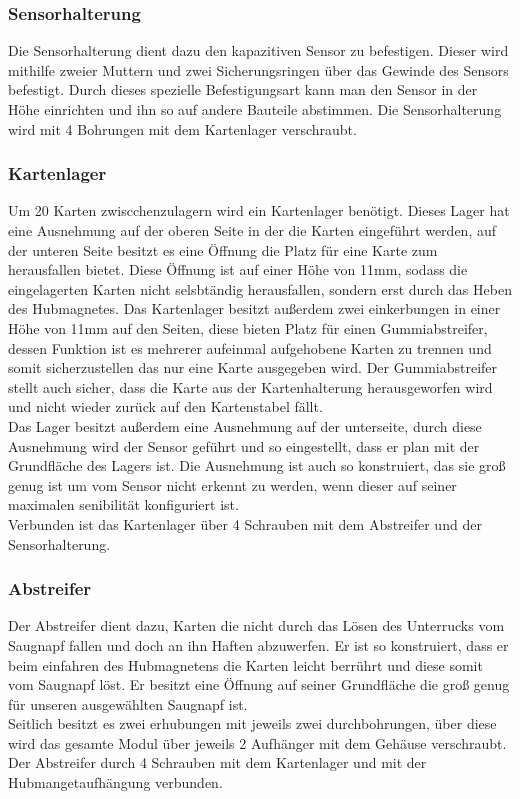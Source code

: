 \subsubsection{Sensorhalterung}
Die Sensorhalterung dient dazu den kapazitiven Sensor zu befestigen. Dieser wird mithilfe zweier Muttern und zwei Sicherungsringen
über das Gewinde des Sensors befestigt. Durch dieses spezielle Befestigungsart kann man den Sensor in der Höhe einrichten und ihn so
auf andere Bauteile abstimmen. Die Sensorhalterung wird mit 4 Bohrungen mit dem Kartenlager verschraubt.

\subsubsection{Kartenlager}

Um 20 Karten zwiscchenzulagern wird ein Kartenlager benötigt. Dieses Lager hat eine Ausnehmung auf der oberen Seite in der die Karten
eingeführt werden, auf der unteren Seite besitzt es eine Öffnung die Platz für eine Karte zum herausfallen bietet. Diese Öffnung ist auf
einer Höhe von 11mm, sodass die eingelagerten Karten nicht selsbtändig herausfallen, sondern erst durch das Heben des Hubmagnetes.
Das Kartenlager besitzt außerdem zwei einkerbungen in einer Höhe von 11mm auf den Seiten, diese bieten Platz für einen Gummiabstreifer,
dessen Funktion ist es mehrerer aufeinmal aufgehobene Karten zu trennen und somit sicherzustellen das nur eine Karte ausgegeben wird.
Der Gummiabstreifer stellt auch sicher, dass die Karte aus der Kartenhalterung herausgeworfen wird und nicht wieder zurück auf den Kartenstabel
fällt. \\
Das Lager besitzt außerdem eine Ausnehmung auf der unterseite, durch diese Ausnehmung wird der Sensor geführt und so eingestellt,
dass er plan mit der Grundfläche des Lagers ist. Die Ausnehmung ist auch so konstruiert, das sie groß genug ist um vom Sensor
nicht erkennt zu werden, wenn dieser auf seiner maximalen senibilität konfiguriert ist.\\
Verbunden ist das Kartenlager über 4 Schrauben mit dem Abstreifer und der Sensorhalterung.

\subsubsection{Abstreifer}

Der Abstreifer dient dazu, Karten die nicht durch das Lösen des Unterrucks vom Saugnapf fallen und doch an ihn Haften
abzuwerfen. Er ist so konstruiert, dass er beim einfahren des Hubmagnetens die Karten leicht berrührt und diese somit vom
Saugnapf löst. Er besitzt eine Öffnung auf seiner Grundfläche die groß genug für unseren ausgewählten Saugnapf ist.\\
Seitlich besitzt es zwei erhubungen mit jeweils zwei durchbohrungen, über diese wird das gesamte Modul über jeweils 2 Aufhänger
mit dem Gehäuse verschraubt. \\
Der Abstreifer durch 4 Schrauben mit dem Kartenlager und mit der Hubmangetaufhängung verbunden.

